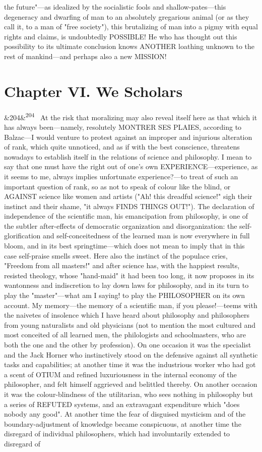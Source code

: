 \documentclass[12pt]{article}
\newcommand{\para}[1][]{\par\noindent\ifx&#1&\else\textsuperscript{\footnotesize #1}~\fi}
\begin{document}
the future"---as idealized by the socialistic fools and shallow-pates---this degeneracy and dwarfing of man to an absolutely gregarious animal (or as they call it, to a man of "free society"), this brutalizing of man into a pigmy with equal rights and claims, is undoubtedly POSSIBLE! He who has thought out this possibility to its ultimate conclusion knows ANOTHER loathing unknown to the rest of mankind---and perhaps also a new MISSION!

\section*{Chapter VI. We Scholars}

\para[204] At the risk that moralizing may also reveal itself here as that which it has always been---namely, resolutely MONTRER SES PLAIES, according to Balzac---I would venture to protest against an improper and injurious alteration of rank, which quite unnoticed, and as if with the best conscience, threatens nowadays to establish itself in the relations of science and philosophy. I mean to say that one must have the right out of one's own EXPERIENCE---experience, as it seems to me, always implies unfortunate experience?---to treat of such an important question of rank, so as not to speak of colour like the blind, or AGAINST science like women and artists ("Ah! this dreadful science!" sigh their instinct and their shame, "it always FINDS THINGS OUT!"). The declaration of independence of the scientific man, his emancipation from philosophy, is one of the subtler after-effects of democratic organization and disorganization: the self-glorification and self-conceitedness of the learned man is now everywhere in full bloom, and in its best springtime---which does not mean to imply that in this case self-praise smells sweet. Here also the instinct of the populace cries, "Freedom from all masters!" and after science has, with the happiest results, resisted theology, whose "hand-maid" it had been too long, it now proposes in its wantonness and indiscretion to lay down laws for philosophy, and in its turn to play the "master"---what am I saying! to play the PHILOSOPHER on its own account. My memory---the memory of a scientific man, if you please!---teems with the naivetes of insolence which I have heard about philosophy and philosophers from young naturalists and old physicians (not to mention the most cultured and most conceited of all learned men, the philologists and schoolmasters, who are both the one and the other by profession). On one occasion it was the specialist and the Jack Horner who instinctively stood on the defensive against all synthetic tasks and capabilities; at another time it was the industrious worker who had got a scent of OTIUM and refined luxuriousness in the internal economy of the philosopher, and felt himself aggrieved and belittled thereby. On another occasion it was the colour-blindness of the utilitarian, who sees nothing in philosophy but a series of REFUTED systems, and an extravagant expenditure which "does nobody any good". At another time the fear of disguised mysticism and of the boundary-adjustment of knowledge became conspicuous, at another time the disregard of individual philosophers, which had involuntarily extended to disregard of 
\end{document}
